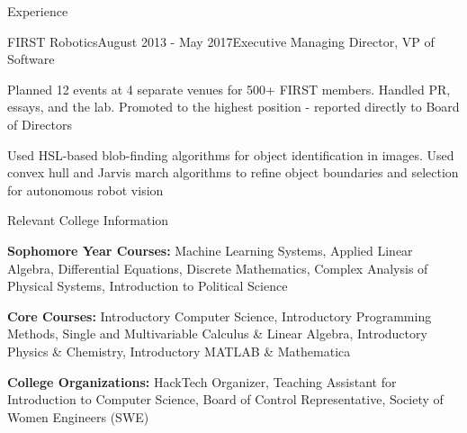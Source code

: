 \documentclass{resume} %
\begin{document}
\begin{rSection}{Experience}

\begin{rSubsection}{FIRST Robotics}{August 2013 - May 2017}{Executive Managing Director, VP of Software}{}
\item Planned 12 events at 4 separate venues for 500+ FIRST members. Handled PR, essays, and the lab. Promoted to the highest position - reported directly to Board of Directors
\item Used HSL-based blob-finding algorithms for object identification in images. Used convex hull and Jarvis march algorithms to refine object boundaries and selection for autonomous robot vision
\end{rSubsection}

\end{rSection}

\begin{rSection}{Relevant College Information} \itemsep -2pt
\item \textbf{Sophomore Year Courses:} Machine Learning Systems, Applied Linear Algebra, Differential Equations, Discrete Mathematics, Complex Analysis of Physical Systems, Introduction to Political Science
\item \textbf{Core Courses:}  Introductory Computer Science, Introductory Programming Methods, Single and Multivariable Calculus \& Linear Algebra, Introductory Physics \& Chemistry, Introductory MATLAB \& Mathematica
\item \textbf{College Organizations:} HackTech Organizer, Teaching Assistant for Introduction to Computer Science, Board of Control Representative, Society of Women Engineers (SWE)
\end{rSection}
\end{document}
